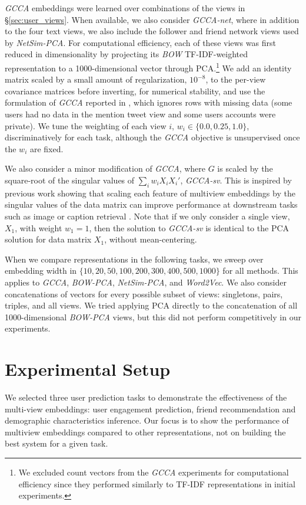\documentclass{article}
\newcommand{\gcca}{\emph{GCCA}} %
\newcommand{\gccasv}{\emph{GCCA-sv}} %
\newcommand{\gccawnet}{\emph{GCCA-net}} %
\newcommand{\bow}{\emph{BOW}} %
\newcommand{\bowpca}{\emph{BOW-PCA}} %
\newcommand{\bowpcawnet}{\emph{NetSim-PCA}} %
\newcommand{\wordtovec}{\emph{Word2Vec}}
\begin{document}
\gcca{} embeddings were learned over combinations of the views in \S \ref{sec:user_views}.  When available, we also consider \gccawnet{}, where in
addition to the four text views, we also include the follower and friend network views used by \bowpcawnet.
For computational efficiency, each of these views was first reduced in dimensionality
by projecting its \bow{} TF-IDF-weighted representation to a 1000-dimensional vector through PCA.\footnote{
We excluded count vectors from the \gcca{} experiments for computational efficiency since they performed
similarly to TF-IDF representations in initial experiments.
} We add
an identity matrix scaled by a small amount of regularization, $10^{-8}$, to the
per-view covariance matrices before inverting, for numerical stability, and use
the formulation of \gcca{} reported in , which ignores rows with
missing data (some users had no data in the mention tweet view and some users accounts
were private).  We tune the weighting of each view $i$,
$w_i \in \{0.0, 0.25, 1.0\}$, discriminatively for each task, although the
\gcca{} objective is unsupervised once the $w_i$ are fixed.

We also consider a minor modification of \gcca, where $G$ is scaled by the
square-root of the singular values of $\sum_i w_i X_i X_i'$, \gccasv. 
This is inspired by previous work showing that scaling each feature
of multiview embeddings by the singular values of the data matrix can
improve performance at downstream tasks such as image or caption retrieval
\cite{mroueh2015}.  Note that if we only consider a single view, $X_1$,
with weight $w_1=1$, then the solution
to \gccasv{} is identical to the PCA solution for data matrix $X_1$, without
mean-centering.

When we compare representations in the following tasks, we sweep over embedding
width in $\{10, 20, 50, 100, 200, 300, 400, 500, 1000\}$ for all methods.
This applies to \gcca, \bowpca, \bowpcawnet, and \wordtovec.  We also consider
concatenations of vectors for every possible subset of views: singletons, pairs,
triples, and all views. We tried applying PCA directly to
the concatenation of all 1000-dimensional \bowpca{} views, but this did not
perform competitively in our experiments.



\section{Experimental Setup}
We selected three user prediction tasks to demonstrate the effectiveness of the multi-view embeddings: user engagement prediction,
friend recommendation and demographic characteristics inference. Our focus is to show the performance of multiview embeddings 
compared to other representations, not on building the best system for a given task.
\end{document}
